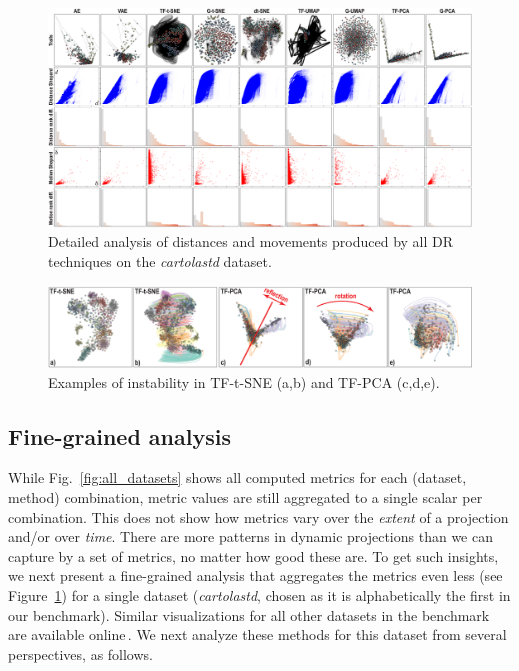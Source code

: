 \begin{figure}[tb]\centering
\hspace*{-0.02\linewidth}
  \includegraphics[width=1.0\linewidth]{figures/projection-evaluation/detailed_cartolastd.pdf}
  \caption{Detailed analysis of distances and movements produced by all DR techniques on the \emph{cartolastd} dataset. }
  \vspace{-0.15cm}
  \label{fig:trails_cartolastd}
\end{figure}

\begin{figure}[tb]\centering
  \includegraphics[width=\linewidth]{figures/projection-evaluation/instability.eps}
  \caption{Examples of instability in TF-t-SNE (a,b) and TF-PCA (c,d,e).}
  \vspace{-0.15cm}
  \label{fig:instability}
\end{figure}


\subsection{Fine-grained analysis}
%
While Fig.~\ref{fig:all_datasets} shows all computed metrics for each (dataset, method) combination, metric values are still aggregated to a single scalar per combination. This does not show how metrics vary over the \emph{extent} of a projection and/or over \emph{time}. There are more patterns in dynamic projections than we can capture by a set of metrics, no matter how good these are. To get such insights, we next present a fine-grained analysis that aggregates the metrics even less (see Figure~\ref{fig:trails_cartolastd}) for a single dataset (\emph{cartolastd}, chosen as it is alphabetically the first in our benchmark).
Similar visualizations for all other datasets in the benchmark are available online\,\citep{repo}. We next analyze these methods for this dataset from several perspectives, as follows.\\

